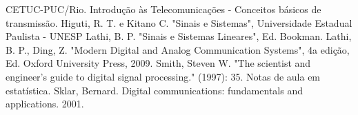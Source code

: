 \begin{thebibliography}{99}
 CETUC-PUC/Rio. Introdução às Telecomunicações - Conceitos básicos de transmissão.
 Higuti, R. T. e Kitano C. "Sinais e Sistemas", Universidade Estadual Paulista - UNESP
 Lathi, B. P. "Sinais e Sistemas Lineares", Ed. Bookman.
 Lathi, B. P., Ding, Z. "Modern Digital and Analog Communication Systems", 4a edição, Ed. Oxford University Press, 2009.
 Smith, Steven W. "The scientist and engineer's guide to digital signal processing." (1997): 35.
 Notas de aula em estatística.
 Sklar, Bernard. Digital communications: fundamentals and applications. 2001.

\end{thebibliography}
